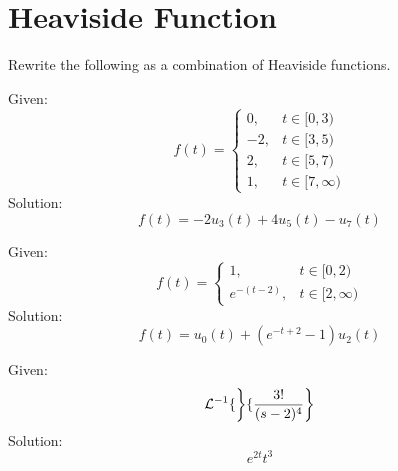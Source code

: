 \documentclass[diffeq.tex]{subfiles}
\begin{document}
\section{Heaviside Function}
Rewrite the following as a combination of Heaviside functions.
\begin{homework*}[263.5]
    Given:
    \begin{equation}
        f(t) = \begin{cases}
            0, &t\in[0,3)\\
            -2, &t\in[3,5)\\
            2, &t\in[5,7)\\
            1, &t\in[7,\infty)
        \end{cases}
    \end{equation}
    Solution:
    \begin{equation}
        f(t) = -2u_{3}(t) + 4u_{5}(t) - u_{7}(t)
    \end{equation}
\end{homework*}
\begin{homework*}[263.7]
    Given:
    \begin{equation}
        f(t) = \begin{cases}
            1, &t\in[0,2)\\
            e^{-(t-2)}, &t\in[2,\infty)
        \end{cases}
    \end{equation}
    Solution:
    \begin{equation}
        f(t) = u_{0}(t) + (e^{-t+2} - 1)u_{2}(t)
    \end{equation}
\end{homework*}
\begin{homework*}[263.13]
    Given:
    \begin{equation}
        \mathcal{L}^{-1}\{\left\}\{\frac{3!}{(s-2)^{4}}\right\}
    \end{equation}
    Solution:
    \begin{equation}
        e^{2t}t^{3}
    \end{equation}
\end{homework*}
\end{document}
